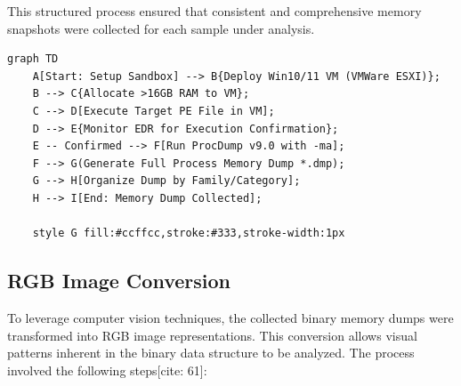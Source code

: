 This structured process ensured that consistent and comprehensive memory snapshots were collected for each sample under analysis.

\begin{verbatim}
graph TD
    A[Start: Setup Sandbox] --> B{Deploy Win10/11 VM (VMWare ESXI)};
    B --> C{Allocate >16GB RAM to VM};
    C --> D[Execute Target PE File in VM];
    D --> E{Monitor EDR for Execution Confirmation};
    E -- Confirmed --> F[Run ProcDump v9.0 with -ma];
    F --> G(Generate Full Process Memory Dump *.dmp);
    G --> H[Organize Dump by Family/Category];
    H --> I[End: Memory Dump Collected];

    style G fill:#ccffcc,stroke:#333,stroke-width:1px
\end{verbatim}


\subsection{RGB Image Conversion}
\label{subsec:rgb_conversion}

To leverage computer vision techniques, the collected binary memory dumps were transformed into RGB image representations. This conversion allows visual patterns inherent in the binary data structure to be analyzed. The process involved the following steps[cite: 61]:

